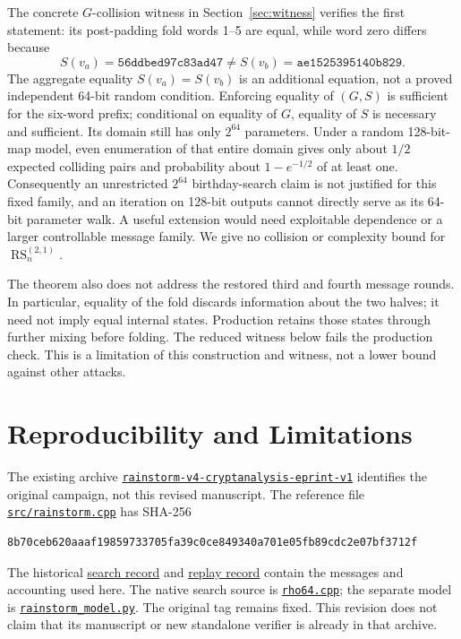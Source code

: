 \documentclass[10pt]{article}
\theoremstyle{definition}
\newcommand{\RS}{\operatorname{RS}}
\newcommand{\code}[1]{\texttt{#1}}
\newcommand{\archiveTag}{rainstorm-v4-cryptanalysis-eprint-v1}
\newcommand{\archiveName}{\nolinkurl{rainstorm-v4-cryptanalysis-eprint-v1}}
\newcommand{\archiveRoot}{https://github.com/DOSAYGO-STUDIO/rain}
\newcommand{\archiveFile}[2]{\href{\archiveRoot/blob/\archiveTag/#1}{#2}}
\begin{document}
The concrete $G$-collision witness in Section~\ref{sec:witness} verifies the first statement: its post-padding fold words 1--5 are equal, while word zero differs because
\[
S(v_a)=\mathtt{56ddbed97c83ad47}\neq
S(v_b)=\mathtt{ae1525395140b829}.
\]
The aggregate equality $S(v_a)=S(v_b)$ is an additional equation, not a proved independent 64-bit random condition. Enforcing equality of $(G,S)$ is sufficient for the six-word prefix; conditional on equality of $G$, equality of $S$ is necessary and sufficient. Its domain still has only $2^{64}$ parameters. Under a random 128-bit-map model, even enumeration of that entire domain gives only about $1/2$ expected colliding pairs and probability about $1-e^{-1/2}$ of at least one. Consequently an unrestricted $2^{64}$ birthday-search claim is not justified for this fixed family, and an iteration on 128-bit outputs cannot directly serve as its 64-bit parameter walk. A useful extension would need exploitable dependence or a larger controllable message family. We give no collision or complexity bound for $\RS_n^{(2,1)}$.

The theorem also does not address the restored third and fourth message rounds. In particular, equality of the fold discards information about the two halves; it need not imply equal internal states. Production retains those states through further mixing before folding. The reduced witness below fails the production check. This is a limitation of this construction and witness, not a lower bound against other attacks.

\section{Reproducibility and Limitations}
The existing archive \href{\archiveRoot/tree/\archiveTag}{\archiveName} identifies the original campaign, not this revised manuscript. The reference file \archiveFile{src/rainstorm.cpp}{\code{src/rainstorm.cpp}} has SHA-256
\begin{lstlisting}[style=code]
8b70ceb620aaaf19859733705fa39c0ce849340a701e05fb89cdc2e07bf3712f
\end{lstlisting}
The historical \archiveFile{research/differential/rebound-campaign-20260908/two-round-native-rho-search.json}{search record} and \archiveFile{research/differential/rebound-campaign-20260908/two-round-native-rho-replay.json}{replay record} contain the messages and accounting used here. The native search source is \archiveFile{research/differential/rho64.cpp}{\code{rho64.cpp}}; the separate model is \archiveFile{research/differential/rainstorm_model.py}{\code{rainstorm\_model.py}}. The original tag remains fixed. This revision does not claim that its manuscript or new standalone verifier is already in that archive.
\end{document}
